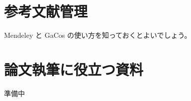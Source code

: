 \chapter{参考文献管理}
  \label{app:bibliography}

  Mendeley と GaCos の使い方を知っておくとよいでしょう。

\chapter{論文執筆に役立つ資料}
  \label{app:useful}

  準備中

